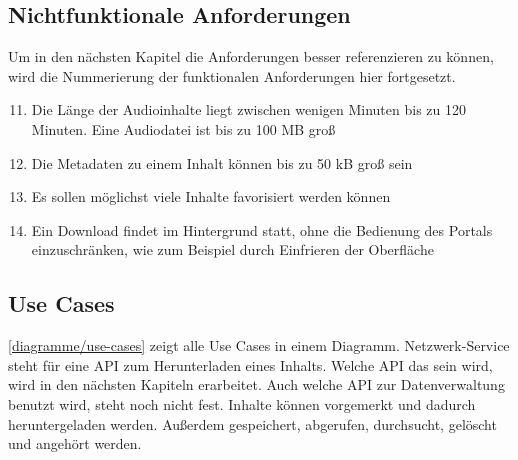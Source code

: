 \subsection{Nichtfunktionale Anforderungen}
Um in den nächsten Kapitel die Anforderungen besser referenzieren zu können, wird die Nummerierung der funktionalen Anforderungen hier fortgesetzt.

\begin{enumerate}
	\setcounter{enumi}{10}
    \item Die Länge der Audioinhalte liegt zwischen wenigen Minuten bis zu 120 Minuten. Eine Audiodatei ist bis zu 100 \ac{MB} groß
    \item Die Metadaten zu einem Inhalt können bis zu 50 \ac{kB} groß sein
    \item Es sollen möglichst viele Inhalte favorisiert werden können
    \item Ein Download findet im Hintergrund statt, ohne die Bedienung des Portals einzuschränken, wie zum Beispiel durch Einfrieren der Oberfläche
\end{enumerate}

\subsection{Use Cases}
\autoref{diagramme/use-cases} zeigt alle Use Cases in einem Diagramm. Netzwerk-Service steht für eine \ac{API} zum Herunterladen eines Inhalts. Welche \ac{API} das sein wird, wird in den nächsten Kapiteln erarbeitet. Auch welche \ac{API} zur Datenverwaltung benutzt wird, steht noch nicht fest. Inhalte können vorgemerkt und dadurch heruntergeladen werden. Außerdem gespeichert, abgerufen, durchsucht, gelöscht und angehört werden.

